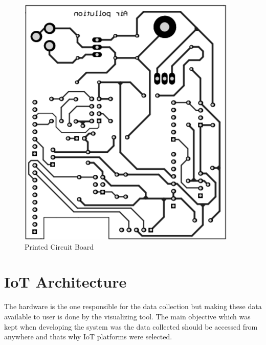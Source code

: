 \begin{figure}[h]
  \begin{center}
  \includegraphics[scale=0.50]{./images/figure10.png}
  \end{center}
  \caption{Printed Circuit Board}
  \label{pcb}
\end{figure}

\section{IoT Architecture}

The hardware is the one responsible for the data collection but making these data available to user is done by the visualizing tool. The main objective which was kept when developing the system was the data collected should be accessed from anywhere and thats why IoT platforms were selected.

